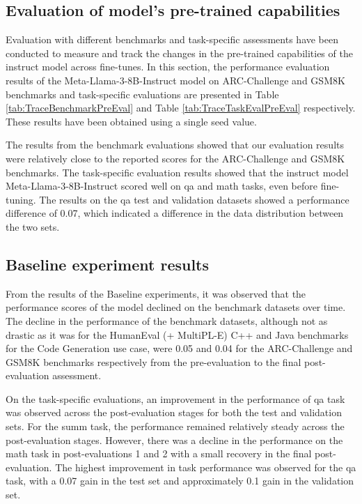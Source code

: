 \subsection{Evaluation of model's pre-trained capabilities}
Evaluation with different benchmarks and task-specific assessments have been conducted to measure and track the changes in the pre-trained capabilities of the instruct model across fine-tunes. In this section, the performance evaluation results of the Meta-Llama-3-8B-Instruct model on ARC-Challenge and GSM8K benchmarks and task-specific evaluations are presented in Table \ref{tab:TraceBenchmarkPreEval} and Table \ref{tab:TraceTaskEvalPreEval} respectively. These results have been obtained using a single seed value.


The results from the benchmark evaluations showed that our evaluation results were relatively close to the reported scores for the ARC-Challenge and GSM8K benchmarks. 
The task-specific evaluation results showed that the instruct model Meta-Llama-3-8B-Instruct scored well on qa and math tasks, even before fine-tuning. The results on the qa test and validation datasets showed a performance difference of 0.07, which indicated a difference in the data distribution between the two sets. 

\subsection{Baseline experiment results}


From the results of the Baseline experiments, it was observed that the performance scores of the model declined on the benchmark datasets over time. The decline in the performance of the benchmark datasets, although not as drastic as it was for the HumanEval (+ MultiPL-E) C++ and Java benchmarks for the Code Generation use case, were 0.05 and 0.04 for the ARC-Challenge and GSM8K benchmarks respectively from the pre-evaluation to the final post-evaluation assessment.  

On the task-specific evaluations, an improvement in the performance of qa task was observed across the post-evaluation stages for both the test and validation sets. For the summ task, the performance remained relatively steady across the post-evaluation stages. However, there was a decline in the performance on the math task in post-evaluations 1 and 2 with a small recovery in the final post-evaluation. The highest improvement in task performance was observed for the qa task, with a 0.07 gain in the test set and approximately 0.1 gain in the validation set. 

